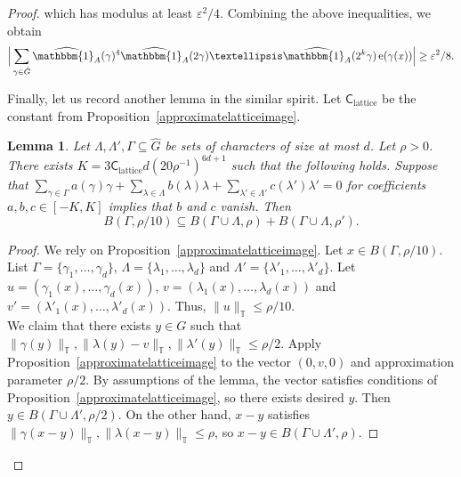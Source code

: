\documentclass[10pt,a4paper]{amsart}
\newtheorem{lemma}{Lemma}
\newcommand\id{\mathbbm{1}}
\newcommand{\on}[1]{
	\operatorname{#1}
}
\begin{document}
\begin{proof}
    which has modulus at least $\varepsilon^2/4$. Combining the above inequalities, we obtain 
    \[\Big|\sum_{\gamma \in \hat{G}} \widehat{\id_A}(\gamma)^4 \widehat{\id_A}(2\gamma)\dots \widehat{\id_A}(2^k\gamma)\on{e}(\gamma(x))\Big| \geq \varepsilon^2/8.\qedhere\]

    Finally, let us record another lemma in the similar spirit. Let $\mathsf{C}_{\on{lattice}}$ be the constant from Proposition~\ref{approximatelatticeimage}.

    \begin{lemma}\label{qrsumbohrs}
        Let $\Lambda, \Lambda', \Gamma \subseteq \hat{G}$ be sets of characters of size at most $d$. Let $\rho > 0$. There exists $K = 3\mathsf{C}_{\on{lattice}}d (20\rho^{-1})^{6d + 1}$ such that the following holds. Suppose that $\sum_{\gamma \in \Gamma} a(\gamma) \gamma + \sum_{\lambda \in \Lambda} b(\lambda) \lambda  + \sum_{\lambda' \in \Lambda'} c(\lambda') \lambda' = 0$ for coefficients $a, b, c \in [-K, K]$ implies that $b$ and $c$ vanish. Then
        \[B(\Gamma, \rho/10) \subseteq B(\Gamma \cup \Lambda, \rho) + B(\Gamma \cup \Lambda, \rho').\]
    \end{lemma}

    \begin{proof}
        We rely on Proposition~\ref{approximatelatticeimage}. Let $x \in B(\Gamma, \rho/10)$. List $\Gamma = \{\gamma_1, \dots, \gamma_d\}$, $\Lambda = \{\lambda_1, \dots, \lambda_d\}$ and $\Lambda' = \{\lambda'_1, \dots, \lambda'_d\}$. Let $u = (\gamma_1(x), \dots, \gamma_d(x))$, $v = (\lambda_1(x), \dots, \lambda_d(x))$ and $v' = (\lambda'_1(x), \dots, \lambda'_d(x))$. Thus, $\|u\|_{\mathbb{T}} \leq \rho/10$.\\

        We claim that there exists $y \in G$ such that $\|\gamma(y)\|_{\mathbb{T}}, \|\lambda(y) - v\|_{\mathbb{T}}, \|\lambda'(y)\|_{\mathbb{T}} \leq \rho/2$. Apply Proposition~\ref{approximatelatticeimage} to the vector $(0, v, 0)$ and approximation parameter $\rho/2$. By assumptions  of the lemma, the vector satisfies conditions of Proposition~\ref{approximatelatticeimage}, so there exists desired $y$. Then $y \in B(\Gamma \cup \Lambda', \rho/2)$. On the other hand, $x - y$ satisfies $\|\gamma(x-y)\|_{\mathbb{T}}, \|\lambda(x - y)\|_{\mathbb{T}} \leq \rho$, so $x -y \in B(\Gamma \cup \Lambda', \rho)$.
    \end{proof}
    


    

    
\end{proof}
\end{document}
